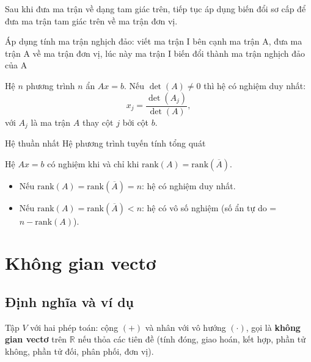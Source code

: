 \documentclass[12pt,a4paper]{article}
\begin{document}
\begin{phuongphap}[title={Phương pháp Gauss-Jordan}]
  Sau khi đưa ma trận về dạng tam giác trên, tiếp tục áp dụng biến đổi sơ cấp để đưa ma trận tam giác trên về ma trận đơn vị.

  Áp dụng tính ma trận nghịch đảo: viết ma trận I bên cạnh ma trận A, đưa ma trận A về ma trận đơn vị, lúc này ma trận I biến đổi thành ma trận nghịch đảo của A
\end{phuongphap}

\begin{dinhly}[title={Hệ Cramer}]
  Hệ $n$ phương trình $n$ ẩn $Ax = b$. Nếu $\det(A) \ne 0$ thì hệ có nghiệm duy nhất:
  \[
    x_j = \frac{\det(A_j)}{\det(A)},
  \]
  với $A_j$ là ma trận $A$ thay cột $j$ bởi cột $b$.
\end{dinhly}

Hệ thuần nhất
Hệ phương trình tuyến tính tổng quát

\begin{dinhly}[title={Định lý Kronecker-Capelli}]
  Hệ $Ax = b$ có nghiệm khi và chỉ khi $\mathrm{rank}(A) = \mathrm{rank}(\overline{A})$.
  \begin{itemize}
    \item Nếu $\mathrm{rank}(A) = \mathrm{rank}(\overline{A}) = n$: hệ có nghiệm duy nhất.
    \item Nếu $\mathrm{rank}(A) = \mathrm{rank}(\overline{A}) < n$: hệ có vô số nghiệm (số ẩn tự do = $n - \mathrm{rank}(A)$).
  \end{itemize}
\end{dinhly}

\section{Không gian vectơ}

\subsection{Định nghĩa và ví dụ}

\begin{dinhnghia}
  Tập $V$ với hai phép toán: cộng $(+)$ và nhân với vô hướng $(\cdot)$, gọi là \textbf{không gian vectơ} trên $\mathbb{R}$ nếu thỏa các tiên đề (tính đóng, giao hoán, kết hợp, phần tử không, phần tử đối, phân phối, đơn vị).
\end{dinhnghia}
\end{document}
